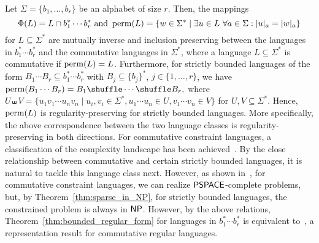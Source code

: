  
 \begin{remark}%
 \label{rem:motivation_strictly_bounded}
Let $\Sigma = \{b_1, \ldots, b_r\}$
be an alphabet of size $r$.
Then, 
the mappings
\[
\Phi(L) = L \cap b_1^* \cdots b_r^* \mbox{ and }
\operatorname{perm}(L) = \{ w \in \Sigma^* \mid \exists u \in L\  \forall a \in \Sigma : |u|_a = |w|_a \}
\]
for $L \subseteq \Sigma^*$ are mutually inverse and inclusion preserving
between the languages in $b_1^* \cdots b_r^*$ and the commutative languages
in $\Sigma^*$, where a language $L \subseteq \Sigma^*$ is commutative 
if $\operatorname{perm}(L) = L$.
Furthermore, for strictly bounded languages of the form $B_1 \cdots B_r \subseteq b_1^* \cdots b_r^*$
with $B_j \subseteq \{b_j\}^*$, $j \in \{1,\ldots, r\}$, we have
$
 \perm(B_1 \cdots B_r) = B_1 \shuffle \cdots \shuffle B_r,
$
where
$U \shuffle V = \{ u_1 v_1 \cdots u_n v_n \mid u_i, v_i \in \Sigma^*, u_1 \cdots u_n \in U, v_1 \cdots v_n \in  V \}$ for $U, V \subseteq \Sigma^*$.
Hence, $\operatorname{perm}(L)$ is regularity-preserving
for strictly bounded languages.
More specifically, the above correspondence between
the two language classes is regularity-preserving in both directions.
For commutative constraint languages, a classification
of the complexity landscape has been achieved~\cite{DBLP:conf/cocoon/Hoffmann20}.
By the close relationship between commutative and certain strictly
bounded languages, it is natural to tackle
this language class next.
However, as shown in~\cite{DBLP:conf/cocoon/Hoffmann20},
for commutative constraint languages, we can realize $\textsf{PSPACE}$-complete
problems, but, by Theorem~\ref{thm:sparse_in_NP},
for strictly bounded languages, the constrained problem is always in $\textsf{NP}$.
However, by the above relations, Theorem~\ref{thm:bounded_regular_form} for languages in $b_1^* \cdots b_r^*$ is equivalent to~\cite[Theorem 5]{DBLP:conf/cocoon/Hoffmann20}, a representation result
for commutative regular languages.
\end{remark}
 
